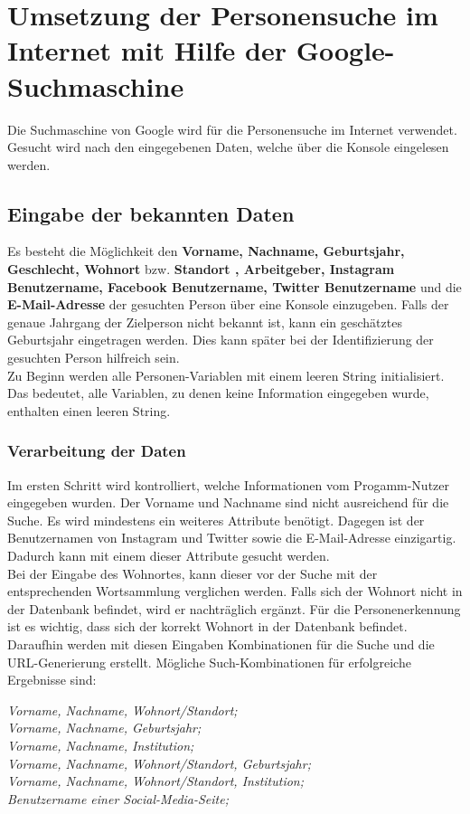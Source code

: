 \section{Umsetzung der Personensuche im Internet mit Hilfe der Google-Suchmaschine}
Die Suchmaschine von Google wird für die Personensuche im Internet verwendet. Gesucht wird nach den eingegebenen Daten, welche über die Konsole eingelesen werden.

	\subsection{Eingabe der bekannten Daten}
	Es besteht die Möglichkeit den \textbf{Vorname, Nachname, Geburtsjahr, Geschlecht, Wohnort} bzw. \textbf{Standort , Arbeitgeber, Instagram Benutzername, Facebook Benutzername, Twitter Benutzername} und die \textbf{E-Mail-Adresse} der gesuchten Person über eine Konsole einzugeben. Falls der genaue Jahrgang der Zielperson nicht bekannt ist, kann ein geschätztes Geburtsjahr eingetragen werden. Dies kann später bei der Identifizierung der gesuchten Person hilfreich sein.\\
	Zu Beginn werden alle Personen-Variablen mit einem leeren String initialisiert. Das bedeutet, alle Variablen, zu denen keine Information eingegeben wurde, enthalten einen leeren String.
	
		\subsubsection{Verarbeitung der Daten}
		Im ersten Schritt wird kontrolliert, welche Informationen vom Progamm-Nutzer eingegeben wurden. Der Vorname und Nachname sind nicht ausreichend für die Suche. Es wird mindestens ein weiteres Attribute benötigt. Dagegen ist der Benutzernamen von Instagram und Twitter sowie die E-Mail-Adresse einzigartig. Dadurch kann mit einem dieser Attribute gesucht werden.\\
		Bei der Eingabe des Wohnortes, kann dieser vor der Suche mit der entsprechenden Wortsammlung verglichen werden. Falls sich der Wohnort nicht in der Datenbank befindet, wird er nachträglich ergänzt. Für die Personenerkennung ist es wichtig, dass sich der korrekt Wohnort in der Datenbank befindet.\\
		Daraufhin werden mit diesen Eingaben Kombinationen für die Suche und die URL-Generierung erstellt. Mögliche Such-Kombinationen für erfolgreiche Ergebnisse sind:
		
		\textit{Vorname, Nachname, Wohnort/Standort;}\\
		\textit{Vorname, Nachname, Geburtsjahr;}\\
		\textit{Vorname, Nachname, Institution;}\\
		\textit{Vorname, Nachname, Wohnort/Standort, Geburtsjahr;}\\
		\textit{Vorname, Nachname, Wohnort/Standort, Institution;}\\
		\textit{Benutzername einer Social-Media-Seite;}
		
